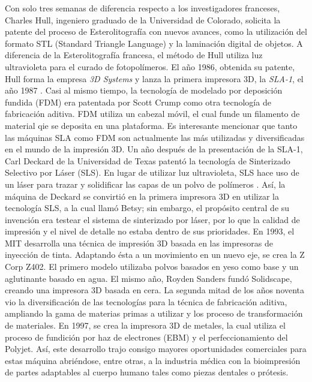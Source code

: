Con solo tres semanas de diferencia respecto a los investigadores franceses, Charles Hull, ingeniero graduado de la Universidad de Colorado, solicita la patente del proceso de Esterolitografía con nuevos avances, como la utilización del formato STL (Standard Triangle Language) y la laminación digital de objetos. A diferencia de la Esterolitografía francesa, el método de Hull utiliza luz ultravioleta para el curado de fotopolímeros. El año 1986, obtenida su patente, Hull forma la empresa \textit{3D Systems} y lanza la primera impresora 3D, la \textit{SLA-1}, el año 1987 \citep{tresdsourced2020}. Casi al mismo tiempo, la tecnología de modelado por deposición fundida (FDM) era patentada por Scott Crump como otra tecnología de fabricación aditiva\citep{alltresdp2018}. FDM utiliza un cabezal móvil, el cual funde un filamento de material qie se deposita en una plataforma. Es interesante mencionar que tanto las máquinas SLA como FDM son actualmente las más utilizadas y diversificadas en el mundo de la impresión 3D.
Un año después de la presentación de la SLA-1, Carl Deckard de la Universidad de Texas patentó la tecnología de Sinterizado Selectivo por Láser (SLS). En lugar de utilizar luz ultravioleta, SLS hace uso de un láser para trazar y solidificar las capas de un polvo de polímeros \citep{tresdsourced2020}. Así, la máquina de Deckard se convirtió en la primera impresora 3D en utilizar la tecnología SLS, a la cual llamó Betsy; sin embargo, el propósito central de su invención era testear el sistema de sinterizado por láser, por lo que la calidad de impresión y el nivel de detalle no estaba dentro de sus prioridades\citep{alltresdp2018}. 
En 1993, el MIT desarrolla una técnica de impresión 3D basada en las impresoras de inyección de tinta. Adaptando ésta a un movimiento en un nuevo eje, se crea la Z Corp Z402. El primero modelo utilizaba polvos basados en yeso como base y un aglutinante basado en agua. El mismo año, Royden Sanders fundó Solidscape, creando una impresora 3D basada en cera.
La segunda mitad de los años noventa vio la diversificación de las tecnologías para la técnica de fabricación aditiva, ampliando la gama de materias primas a utilizar y los proceso de transformación de materiales. En 1997, se crea la impresora 3D de metales, la cual utiliza el proceso de fundición por haz de electrones (EBM) y el perfeccionamiento del Polyjet. Así, este desarrollo trajo consigo mayores oportunidades comerciales para estas máquina abriéndose, entre otras, a la industria médica con la bioimpresión de partes adaptables al cuerpo humano tales como piezas dentales o prótesis\citep{tresdsourced2020}.
